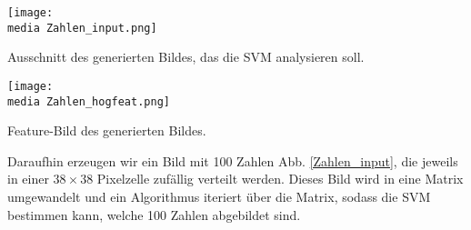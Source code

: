 \begin{dsafigure}
\begin{center}
	\texttt{[image: \\media Zahlen\_input.png]}
	\caption{Ausschnitt des generierten Bildes, das die SVM analysieren soll.}
	\label{Zahlen_input}
\end{center}
\end{dsafigure}

\begin{dsafigure}
\begin{center}
	\texttt{[image: \\media Zahlen\_hogfeat.png]}
	\caption{Feature-Bild des generierten Bildes.}
	\label{Zahlen_hogfeat}
\end{center}
\end{dsafigure}

Daraufhin erzeugen wir ein Bild mit 100 Zahlen Abb. \ref{Zahlen_input}, die jeweils in einer $38 \times 38$ Pixelzelle zufällig verteilt werden. Dieses Bild wird in eine Matrix umgewandelt und ein Algorithmus iteriert über die Matrix, sodass die SVM bestimmen kann, welche 100 Zahlen abgebildet sind.



